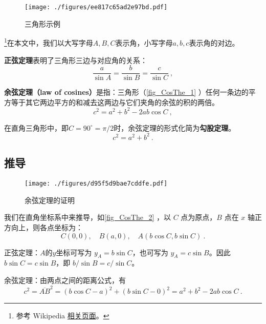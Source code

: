 
\begin{figure}[ht]
\centering
\texttt{[image: ./figures/ee817c65ad2e97bd.pdf]}
\caption{三角形示例} \label{fig_CosThe_1}
\end{figure}

\footnote{参考 Wikipedia \href{https://en.wikipedia.org/wiki/Law_of_cosines}{相关页面}。}在本文中，我们以大写字母$A, B, C$表示角，小写字母$a, b, c$表示角的对边。

\textbf{正弦定理}表明了三角形三边与对应角的关系：
\begin{equation}
\frac{a}{\sin A} = \frac{b}{\sin B} = \frac{c}{\sin C} ~,
\end{equation}

\textbf{余弦定理（law of cosines）}是指：三角形（\autoref{fig_CosThe_1} ）任何一条边的平方等于其它两边平方的和减去这两边与它们夹角的余弦的积的两倍。
\begin{equation}\label{eq_CosThe_1}
c^2=a^2 + b^2 - 2ab\cos C~,
\end{equation}

在直角三角形中，即$C=90^\circ = \pi / 2$时，余弦定理的形式化简为\textbf{勾股定理}。
\begin{equation}
c^2 = a^2 + b^2~.
\end{equation}

\subsection{推导}
\begin{figure}[ht]
\centering
\texttt{[image: ./figures/d95f5d9bae7cddfe.pdf]}
\caption{余弦定理的证明} \label{fig_CosThe_2}
\end{figure}
我们在直角坐标系中来推导，如\autoref{fig_CosThe_2} ，以 $C$ 点为原点，$B$ 点在 $x$ 轴正方向上，则各点坐标为：
\begin{equation}
C(0,0),\quad B(a,0),\quad A(b\cos C,b\sin C)~.
\end{equation}

正弦定理：$A$的$y$坐标可写为 $y_A = b \sin C$，也可写为 $y_A = c \sin B$。因此 $b \sin C = c \sin B$，即 $b/ \sin B = c / \sin C$。

余弦定理：由两点之间的距离公式，有
\begin{equation}
c^2=\overline{AB}^2=(b\cos C-a)^2+(b\sin C-0)^2=a^2+b^2-2ab\cos C~.
\end{equation}

